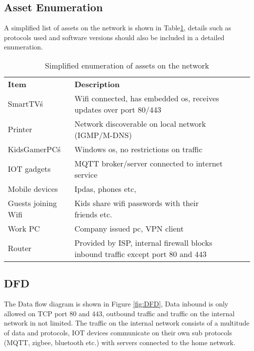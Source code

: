 \documentclass[
	letterpaper, %
	10pt, %
	unnumberedsections, %
	twoside, %
]{APAAssignment}
\begin{document}
\subsection{Asset Enumeration}
A simplified list of assets on the network is shown in Table\ref{tab:assets}, details such as protocols used and software versions should also be included in a detailed enumeration.

\begin{table}[htp]
	\begin{tabular}{|l|l|lll}
		\cline{1-2}
		\textbf{Item}       & \textbf{Description}                                                             &  &  &  \\ \cline{1-2}
		SmartTV\'s           & Wifi connected, has embedded os, receives updates over port 80/443               &  &  &  \\ \cline{1-2}
		Printer             & Network discoverable on local network (IGMP/M-DNS)                               &  &  &  \\ \cline{1-2}
		KidsGamerPC\'s       & Windows os, no restrictions on traffic                                           &  &  &  \\ \cline{1-2}
		IOT gadgets         & MQTT broker/server connected to internet service                                 &  &  &  \\ \cline{1-2}
		Mobile devices      & Ipdas, phones etc,                                                               &  &  &  \\ \cline{1-2}
		Guests joining Wifi & Kids share wifi passwords with their friends etc.                                &  &  &  \\ \cline{1-2}
		Work PC             & Company issued pc, VPN client                                                    &  &  &  \\ \cline{1-2}
		Router              & Provided by ISP, internal firewall blocks inbound traffic except port 80 and 443 &  &  &  \\ \cline{1-2}
	\end{tabular}
	\caption{Simplified enumeration of assets on the network}
	\label{tab:assets}
\end{table}


\subsection{DFD}
The Data flow diagram is shown in Figure \ref{fig:DFD}, Data inbound is only allowed on TCP port 80 and 443, outbound traffic and traffic on the internal network in not limited. The traffic on the internal network consists of a multitude of data and protocols, IOT devices communicate on their own sub protocols (MQTT, zigbee, bluetooth etc.) with servers connected to the home network.
\end{document}
